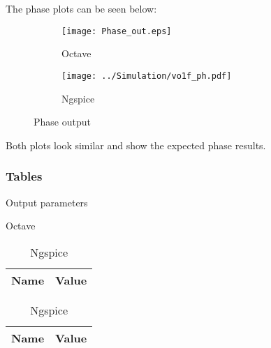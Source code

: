The phase plots can be seen below:

\begin{figure}[H]
\centering
\begin{subfigure}{.49\textwidth}
  \centering
  \texttt{[image: Phase\_out.eps]}
  \caption{Octave}
  \label{fig:PhaOC}
\end{subfigure}%
\begin{subfigure}{.49\textwidth}
  \centering
  \texttt{[image: ../Simulation/vo1f\_ph.pdf]}
  \caption{Ngspice}
  \label{fig:PhaNG}
\end{subfigure}
\caption{Phase output}
\label{fig:Phase}
\end{figure}

\indent

Both plots look similar and show the expected phase results. 

\subsubsection*{Tables}

\begin{table}[H]
    \caption{Output parameters}
    \begin{subtable}{.5\linewidth}
      \centering
        \caption{Octave}
        \begin{tabular}{ll}
        \hline    
        {\bf Name} & {\bf Value} \\ \hline
        
        \end{tabular}
        \label{tab:OutParamOc}
    \end{subtable}%
    \begin{subtable}{.5\linewidth}
      \centering
        \caption{Ngspice}
        \begin{tabular}{ll}
        \hline    
        {\bf Name} & {\bf Value} \\ \hline
        
        \end{tabular}
        \label{tab:OutParamNG}
    \end{subtable} 
    \label{tab:OutParam}
\end{table}
\indent



